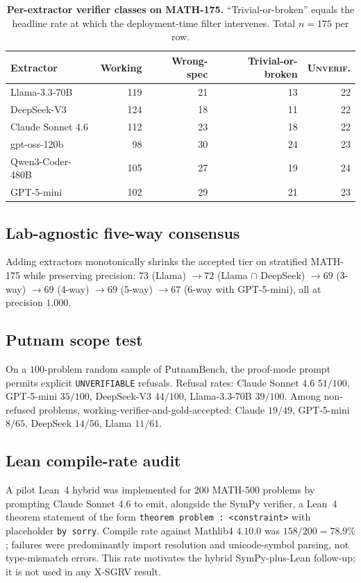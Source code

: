 \documentclass{article}
\begin{document}
\begin{table}[h]
\centering
\caption{\textbf{Per-extractor verifier classes on MATH-175.} ``Trivial-or-broken'' equals the headline rate at which the deployment-time filter intervenes. Total $n{=}175$ per row.}
\label{tab:perext-app}
\small
\begin{tabular}{lrrrr}
\toprule
Extractor & Working & Wrong-spec & Trivial-or-broken & \textsc{Unverif.} \\
\midrule
Llama-3.3-70B          & 119 & 21 & 13 & 22 \\
DeepSeek-V3            & 124 & 18 & 11 & 22 \\
Claude Sonnet 4.6      & 112 & 23 & 18 & 22 \\
gpt-oss-120b           &  98 & 30 & 24 & 23 \\
Qwen3-Coder-480B       & 105 & 27 & 19 & 24 \\
GPT-5-mini             & 102 & 29 & 21 & 23 \\
\bottomrule
\end{tabular}
\end{table}

\subsection{Lab-agnostic five-way consensus}

Adding extractors monotonically shrinks the accepted tier on stratified MATH-175 while preserving precision: $73$ (Llama) $\to 72$ (Llama $\cap$ DeepSeek) $\to 69$ (3-way) $\to 69$ (4-way) $\to 69$ (5-way) $\to 67$ (6-way with GPT-5-mini), all at precision $1.000$.

\subsection{Putnam scope test}

On a $100$-problem random sample of PutnamBench, the proof-mode prompt permits explicit \texttt{UNVERIFIABLE} refusals. Refusal rates: Claude Sonnet 4.6 $51/100$, GPT-5-mini $35/100$, DeepSeek-V3 $44/100$, Llama-3.3-70B $39/100$. Among non-refused problems, working-verifier-and-gold-accepted: Claude $19/49$, GPT-5-mini $8/65$, DeepSeek $14/56$, Llama $11/61$.

\subsection{Lean compile-rate audit}

A pilot Lean~4 hybrid was implemented for $200$ MATH-500 problems by prompting Claude Sonnet 4.6 to emit, alongside the SymPy verifier, a Lean~4 theorem statement of the form \texttt{theorem problem : <constraint>} with placeholder \texttt{by sorry}. Compile rate against Mathlib4 $4.10.0$ was $158/200 = 78.9\%$; failures were predominantly import resolution and unicode-symbol parsing, not type-mismatch errors. This rate motivates the hybrid SymPy-plus-Lean follow-up; it is not used in any X-SGRV result.
\end{document}
